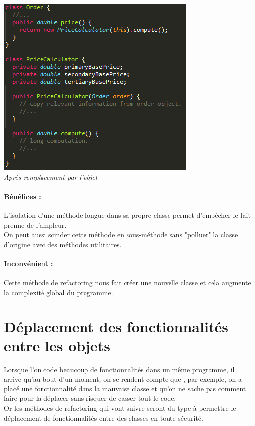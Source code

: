 \documentclass[a4paper,twoside,12pt,openright]{report}
\begin{document}
\begin{center}
\includegraphics[scale=1]{Image/MethodeToObjet2.png}\\
\itshape{Après remplacement par l'objet \cite{ref5}}
\end{center}

\paragraph{Bénéfices :}
L'isolation d'une méthode longue dans sa propre classe permet d'empêcher le fait prenne de l'ampleur.\\
On peut aussi scinder cette méthode en sous-méthode sans "polluer" la classe d'origine avec des méthodes utilitaires.

\paragraph{Inconvénient :}
Cette méthode de refactoring nous fait créer une nouvelle classe et cela augmente la complexité global du programme.\\

\newpage

\section{Déplacement des fonctionnalités entre les objets}
Lorsque l'on code beaucoup de fonctionnalités dans un même programme, il arrive qu'au bout d'un moment, on se rendent compte que , par exemple, on a placé une fonctionnalité dans la mauvaise classe et qu'on ne sache pas comment faire pour la déplacer sans risquer de casser tout le code.\\
Or les méthodes de refactoring qui vont suivre seront du type à permettre le déplacement de fonctionnalités entre des classes en toute sécurité.\\
\end{document}

